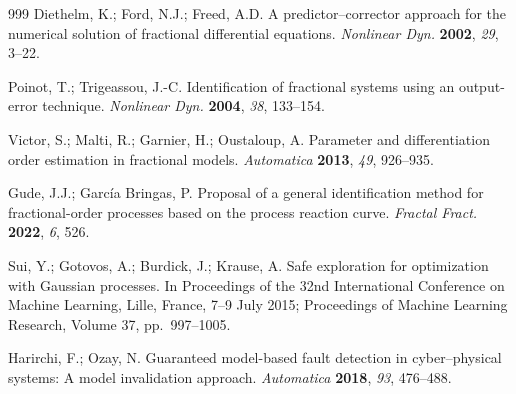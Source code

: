 \documentclass[mathematics,article,accept,pdftex,moreauthors]{Definitions/mdpi}
\begin{document}
\begin{thebibliography}{999}
 Diethelm, K.; Ford, N.J.; Freed, A.D. A predictor--corrector approach for the numerical solution of fractional differential equations. \textit{Nonlinear Dyn.} \textbf{2002}, \emph{29}, 3--22.

 Poinot, T.; Trigeassou, J.-C. Identification of fractional systems using an output-error technique. \textit{Nonlinear Dyn.} \textbf{2004}, \emph{38}, 133--154.

 Victor, S.; Malti, R.; Garnier, H.; Oustaloup, A. Parameter and differentiation order estimation in fractional models. \textit{Automatica} \textbf{2013}, \emph{49}, 926--935.

 Gude, J.J.; Garc\'ia Bringas, P. Proposal of a general identification method for fractional-order processes based on the process reaction curve. \textit{Fractal Fract.} \textbf{2022}, \emph{6}, 526.

 Sui, Y.; Gotovos, A.; Burdick, J.; Krause, A. Safe exploration for optimization with Gaussian processes. In Proceedings of the 32nd International Conference on Machine Learning, Lille, France, 7--9 July 2015; Proceedings of Machine Learning Research, Volume 37, pp.~997--1005.

 Harirchi, F.; Ozay, N. Guaranteed model-based fault detection in cyber--physical systems: A model invalidation approach. \textit{Automatica} \textbf{2018}, \emph{93}, 476--488.

\end{thebibliography}

\PublishersNote{}
\end{document}
